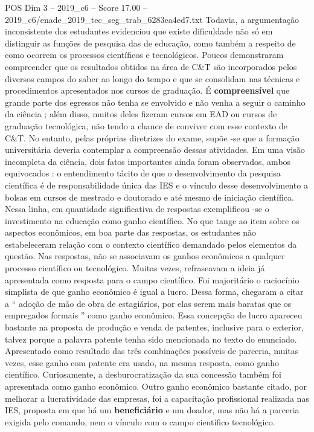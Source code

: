 \begin{textsample}{POS Dim 3 – 2019\_c6 – Score 17.00 – 2019\_c6/enade\_2019\_tec\_seg\_trab\_6283ea4ed7.txt}
Todavia, a argumentação inconsistente dos estudantes evidenciou que existe dificuldade não só em distinguir as funções de pesquisa das de educação, como também a respeito de como ocorrem os processos científicos e tecnológicos.
Poucos demonstraram compreender que os resultados obtidos na área de C\&T são incorporados pelos diversos campos do saber ao longo do tempo e que se consolidam nas técnicas e procedimentos apresentados nos cursos de graduação.
É \textbf{compreensível} que grande parte dos egressos não tenha se envolvido e não venha a seguir o caminho da ciência ; além disso, muitos deles fizeram cursos em EAD ou cursos de graduação tecnológica, não tendo a chance de conviver com esse contexto de C\&T.
No entanto, pelas próprias diretrizes do exame, supõe -se que a formação universitária deveria contemplar a compreensão dessas atividades.
Em uma visão incompleta da ciência, dois fatos importantes ainda foram observados, ambos equivocados : o entendimento tácito de que o desenvolvimento da pesquisa científica é de responsabilidade única das IES e o vínculo desse desenvolvimento a bolsas em cursos de mestrado e doutorado e até mesmo de iniciação científica.
Nessa linha, em quantidade significativa de respostas exemplificou -se o investimento na educação como ganho científico.
No que tange ao item sobre os aspectos econômicos, em boa parte das respostas, os estudantes não estabeleceram relação com o contexto científico demandado pelos elementos da questão.
Nas respostas, não se associavam os ganhos econômicos a qualquer processo científico ou tecnológico.
Muitas vezes, refraseavam a ideia já apresentada como resposta para o campo científico.
Foi majoritário o raciocínio simplista de que ganho econômico é igual a lucro.
Dessa forma, chegaram a citar a “ adoção de mão de obra de estagiários, por elas serem mais baratas que os empregados formais ” como ganho econômico.
Essa concepção de lucro apareceu bastante na proposta de produção e venda de patentes, inclusive para o exterior, talvez porque a palavra patente tenha sido mencionada no texto do enunciado.
Apresentado como resultado das três combinações possíveis de parceria, muitas vezes, esse ganho com patente era usado, na mesma resposta, como ganho científico.
Curiosamente, a desburocratização da sua concessão também foi apresentada como ganho econômico.
Outro ganho econômico bastante citado, por melhorar a lucratividade das empresas, foi a capacitação profissional realizada nas IES, proposta em que há um \textbf{beneficiário} e um doador, mas não há a parceria exigida pelo comando, nem o vínculo com o campo científico tecnológico.

\end{textsample}
